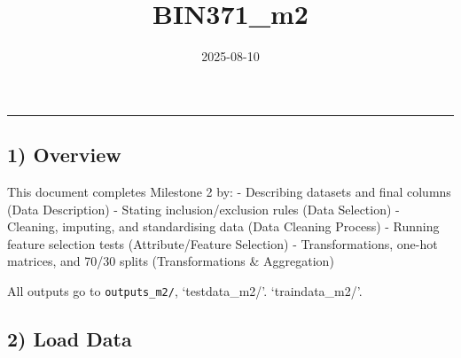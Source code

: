 \documentclass[
]{article}
\title{BIN371\_m2}
\author{}
\date{\vspace{-2.5em}2025-08-10}
\begin{document}
\maketitle

\begin{center}\rule{0.5\linewidth}{0.5pt}\end{center}

\subsection{1) Overview}\label{overview}

This document completes Milestone 2 by: - Describing datasets and final
columns (Data Description) - Stating inclusion/exclusion rules (Data
Selection) - Cleaning, imputing, and standardising data (Data Cleaning
Process) - Running feature selection tests (Attribute/Feature Selection)
- Transformations, one-hot matrices, and 70/30 splits (Transformations
\& Aggregation)

All outputs go to \texttt{outputs\_m2/}, `testdata\_m2/'.
`traindata\_m2/'.

\subsection{2) Load Data}\label{load-data}
\end{document}

